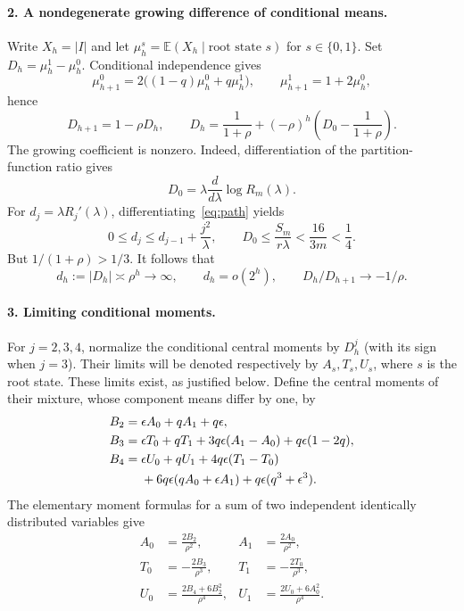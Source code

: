 \documentclass[11pt]{article}
\newcommand{\E}{\mathbb E}
\begin{document}
\paragraph{2. A nondegenerate growing difference of conditional means.}
Write $X_h=|I|$ and let $\mu_h^s=\E(X_h\mid\text{root state }s)$ for $s\in\{0,1\}$. Set $D_h=\mu_h^1-\mu_h^0$. Conditional independence gives
\[
 \mu_{h+1}^0=2\bigl((1-q)\mu_h^0+q\mu_h^1\bigr),\qquad
 \mu_{h+1}^1=1+2\mu_h^0,
\]
hence
\begin{equation}\label{eq:D}
 D_{h+1}=1-\rho D_h,\qquad
 D_h=\frac1{1+\rho}+(-\rho)^h\left(D_0-\frac1{1+\rho}\right).
\end{equation}
The growing coefficient is nonzero. Indeed, differentiation of the partition-function ratio gives
\[
 D_0=\lambda\frac{d}{d\lambda}\log R_m(\lambda).
\]
For $d_j=\lambda R_j'(\lambda)$, differentiating~\eqref{eq:path} yields
\[
 0\le d_j\le d_{j-1}+\frac{j^2}{\lambda},
 \qquad D_0\le\frac{S_m}{r\lambda}<\frac{16}{3m}<\frac14.
\]
But $1/(1+\rho)>1/3$. It follows that
\begin{equation}\label{eq:scale}
 d_h:=|D_h|\asymp\rho^h\longrightarrow\infty,
 \qquad d_h=o(2^h),\qquad D_h/D_{h+1}\longrightarrow-1/\rho.
\end{equation}

\paragraph{3. Limiting conditional moments.}
For $j=2,3,4$, normalize the conditional central moments by $D_h^j$ (with its sign when $j=3$). Their limits will be denoted respectively by $A_s,T_s,U_s$, where $s$ is the root state. These limits exist, as justified below. Define the central moments of their mixture, whose component means differ by one, by
\begin{align}
 B_2={}&\epsilon A_0+q A_1+q\epsilon,\label{eq:B2}\\
 B_3={}&\epsilon T_0+q T_1+3q\epsilon(A_1-A_0)
       +q\epsilon(1-2q),\label{eq:B3}\\
 B_4={}&\epsilon U_0+q U_1+4q\epsilon(T_1-T_0)\notag\\
 &+6q\epsilon(q A_0+\epsilon A_1)
       +q\epsilon(q^3+\epsilon^3).\label{eq:B4}
\end{align}
The elementary moment formulas for a sum of two independent identically distributed variables give
\begin{align}
 A_0&=\frac{2B_2}{\rho^2},& A_1&=\frac{2A_0}{\rho^2},\label{eq:A}\\
 T_0&=-\frac{2B_3}{\rho^3},& T_1&=-\frac{2T_0}{\rho^3},\label{eq:T}\\
 U_0&=\frac{2B_4+6B_2^2}{\rho^4},&
 U_1&=\frac{2U_0+6A_0^2}{\rho^4}.\label{eq:U}
\end{align}
\end{document}
